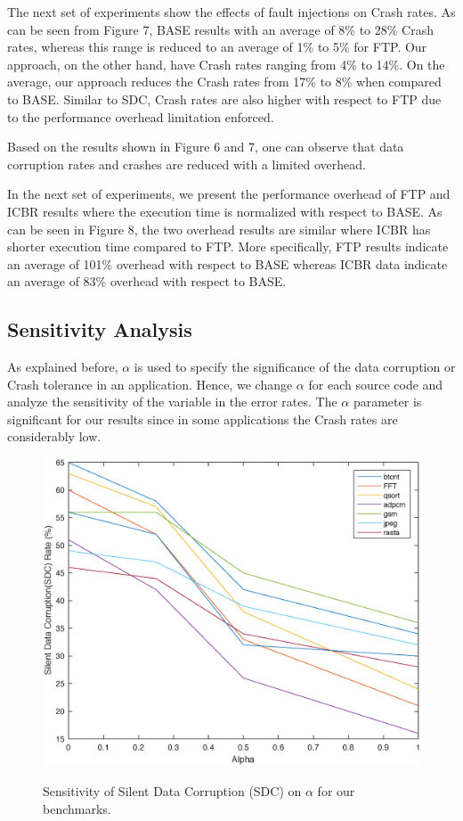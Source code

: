 The next set of experiments show the effects of fault injections on Crash rates. As can be seen from Figure 7, BASE results with an average of 8\% to 28\% Crash rates, whereas this range is reduced to an average of 1\% to 5\% for FTP. Our approach, on the other hand, have Crash rates ranging from 4\% to 14\%. On the average, our approach reduces the Crash rates from 17\% to 8\% when compared to BASE. Similar to SDC, Crash rates are also higher with respect to FTP due to the performance overhead limitation enforced. 

Based on the results shown in Figure 6 and 7, one can observe that data corruption rates and crashes are reduced with a limited overhead.

In the next set of experiments, we present the performance overhead of FTP and ICBR results where the execution time is normalized with respect to BASE. As can be seen in Figure 8, the two overhead results are similar where ICBR has shorter execution time compared to FTP. More specifically, FTP results indicate an average of 101\% overhead with respect to BASE whereas ICBR data indicate an average of 83\% overhead with respect to BASE. 


\subsection{Sensitivity Analysis}\label{sec:Sensitivity}
As explained before, $\alpha$ is used to specify the significance of the data corruption or Crash tolerance in an application. Hence, we change $\alpha$ for each source code and analyze the sensitivity of the variable in the error rates. The $\alpha$ parameter is significant for our results since in some applications the Crash rates are considerably low. 

\begin{figure}[!t]
\begin{center}
{\label{fig:plan_13}\includegraphics[scale=0.32]{./figures/figure9.eps}}
\end{center}
\caption{Sensitivity of Silent Data Corruption (SDC) on $\alpha$ for our benchmarks.}
\label{fig:plan_13}
\end{figure}

